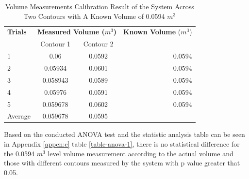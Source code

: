 \begin{enumerate}
	      \begin{table}[H]
		      \centering
		      \begin{threeparttable}
			      \caption{Volume Measurements Calibration Result of the System Across Two Contours with A Known Volume of 0.0594 $m^3$}
			      \label{table:test_case_2-1_results}
			      \begin{tabular}{l c c r}
				      \toprule
				      \textbf{Trials} & \multicolumn{2}{c}{\textbf{Measured Volume ($m^{3}$)}} & \textbf{Known Volume} ($m^{3}$)          \\
				      {}              & Contour 1                                              & Contour 2                       & {}     \\ \midrule
				      1               & 0.06                                                   & 0.0592                          & 0.0594 \\
				      2               & 0.05934                                                & 0.0601                          & 0.0594 \\
				      3               & 0.058943                                               & 0.0589                          & 0.0594 \\
				      4               & 0.05976                                                & 0.0591                          & 0.0594 \\
				      5               & 0.059678                                               & 0.0602                          & 0.0594 \\ \midrule
				      Average         & 0.059678                                               & 0.0595                          & {}     \\ \bottomrule
			      \end{tabular}
		      \end{threeparttable}
	      \end{table}


	      Based on the conducted ANOVA test and the statistic analysis table can be seen in Appendix \ref{appen:c} table \ref{table-anova-1}, there is no statistical difference for the 0.0594 $m^3$ level volume measurement according to the actual volume and those with different contours measured by the system with p value greater that 0.05.




\end{enumerate}
